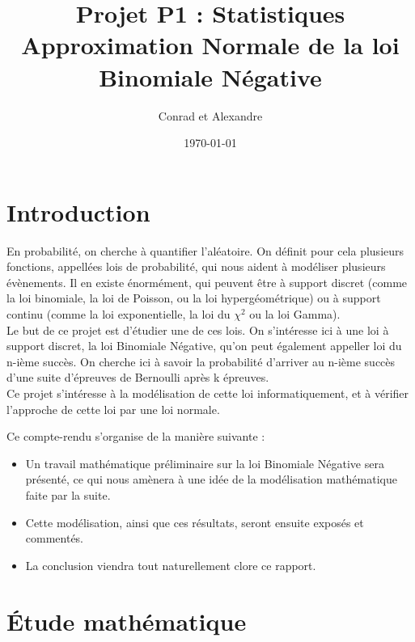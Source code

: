 \documentclass{article}
\author{Conrad \bsc{Hillairet} et Alexandre \bsc{Vieira}}
\title{Projet P1 : Statistiques \\ \Large{Approximation Normale de la loi Binomiale Négative}}
\date{\today}
\begin{document}
\maketitle

\setcounter{tocdepth}{4}
\tableofcontents
\newpage

\section*{Introduction}
En probabilité, on cherche à quantifier l'aléatoire. On définit pour cela plusieurs fonctions, appellées lois de probabilité, qui nous aident à modéliser plusieurs évènements. Il en existe énormément, qui peuvent être à support discret (comme la loi binomiale, la loi de Poisson, ou la loi hypergéométrique) ou à support continu (comme la loi exponentielle, la loi du $\chi^2$ ou la loi Gamma). \\
Le but de ce projet est d'étudier une de ces lois. On s'intéresse ici à une loi à support discret, la loi Binomiale Négative, qu'on peut également appeller loi du n-ième succès. On cherche ici à savoir la probabilité d'arriver au n-ième succès d'une suite d'épreuves de Bernoulli après k épreuves.\\
Ce projet s'intéresse à la modélisation de cette loi informatiquement, et à vérifier l'approche de cette loi par une loi normale.

\bigskip
Ce compte-rendu s'organise de la manière suivante :\\
\begin{itemize}
	\item Un travail mathématique préliminaire sur la loi Binomiale Négative sera présenté, ce qui nous amènera à une idée de la modélisation mathématique faite par la suite.
	\item Cette modélisation, ainsi que ces résultats, seront ensuite exposés et commentés.
	\item La conclusion viendra tout naturellement clore ce rapport.
\end{itemize}



\newpage
\section{Étude mathématique}
\end{document}
